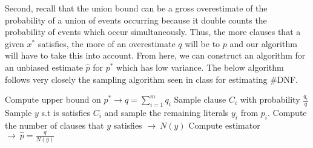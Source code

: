 \documentclass[12pt]{article}
\begin{document}
\begin{solution}
Second, recall that the union bound can be a gross overestimate of the probability of a union of events occurring because it double counts the probability of events which occur simultaneously. Thus, the more clauses that a given $x^*$ satisfies, the more of an overestimate $q$ will be to $p$ and our algorithm will have to take this into account. From here, we can construct an algorithm for an unbiased estimate $\hat{p}$ for $p^*$ which has low variance. The below algorithm follows very closely the sampling algorithm seen in class for estimating \#DNF. \\
\newpage
\begin{answerbox}
\begin{algorithmic}
\State Compute upper bound on $p^* \rightarrow q = \sum_{i=1}^m{q_i}$
\State Sample clause $C_i$ with probability $\frac{q_i}{q}$
\State Sample $y$ s.t is satisfies $C_i$ and sample the remaining literals $y_i$ from $p_i$.
\State Compute the number of clauses that $y$ satisfies $\rightarrow ~ N(y)$
\State Compute estimator $\rightarrow ~ \hat{p} = \frac{q}{N(y)}$
\State {}


\end{algorithmic}
\end{answerbox}
\end{solution}
\end{document}
